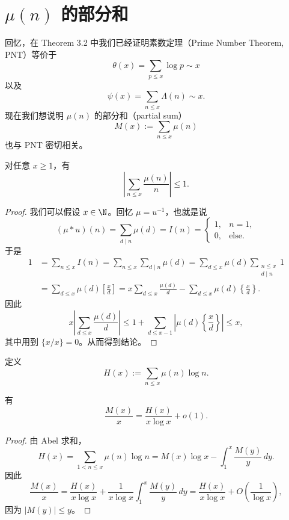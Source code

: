 \section{\texorpdfstring{\(\mu(n)\) 的部分和}{mu(n) 的部分和}}

回忆，在 Theorem 3.2 中我们已经证明素数定理（Prime Number Theorem, PNT）等价于
\[
	\theta(x)=\sum_{p\leq x}\log p\sim x
\]
以及
\[
	\psi(x)=\sum_{n\leq x}\Lambda(n)\sim x.
\]
现在我们想说明 $\mu(n)$ 的部分和（partial sum）
\[
	M(x):=\sum_{n\leq x}\mu(n)
\]
也与 PNT 密切相关。

\begin{lemma}[原文 Lemma 3.16]
	对任意 $x\geq 1$，有
	\[
		\left|\sum_{n\leq x}\frac{\mu(n)}n\right|\leq 1.
	\]
\end{lemma}

\begin{proof}
	我们可以假设 $x\in\N$。回忆 $\mu=u^{-1}$，也就是说
	\[
		(\mu*u)(n)=\sum_{d\mid n}\mu(d)=I(n)
		=
		\begin{cases}
			1, & n=1,\\
			0, & \text{else}.
		\end{cases}
	\]
	于是
	\[
	\begin{aligned}
		1
		&=
		\sum_{n\leq x}I(n)
		=
		\sum_{n\leq x}\sum_{d\mid n}\mu(d)
		=
		\sum_{d\leq x}\mu(d)\sum_{\substack{n\leq x\\ d\mid n}}1\\
		&=
		\sum_{d\leq x}\mu(d)\left[\frac xd\right]
		=
		x\sum_{d\leq x}\frac{\mu(d)}d
		-
		\sum_{d\leq x}\mu(d)\left\{\frac xd\right\}.
	\end{aligned}
	\]
	因此
	\[
		x\left|\sum_{d\leq x}\frac{\mu(d)}d\right|
		\leq
		1+\sum_{d\leq x-1}\left|\mu(d)\left\{\frac xd\right\}\right|
		\leq
		x,
	\]
	其中用到 $\{x/x\}=0$。从而得到结论。
\end{proof}

定义
\[
	H(x):=\sum_{n\leq x}\mu(n)\log n.
\]

\begin{lemma}[原文 Lemma 3.17]
	有
	\[
		\frac{M(x)}x
		=
		\frac{H(x)}{x\log x}+o(1).
	\]
\end{lemma}

\begin{proof}
	由 Abel 求和，
	\[
		H(x)
		=
		\sum_{1<n\leq x}\mu(n)\log n
		=
		M(x)\log x-\int_1^x\frac{M(y)}y\,dy.
	\]
	因此
	\[
		\frac{M(x)}x
		=
		\frac{H(x)}{x\log x}
		+
		\frac1{x\log x}\int_1^x\frac{M(y)}y\,dy
		=
		\frac{H(x)}{x\log x}
		+
		O\left(\frac1{\log x}\right),
	\]
	因为 $|M(y)|\leq y$。
\end{proof}

